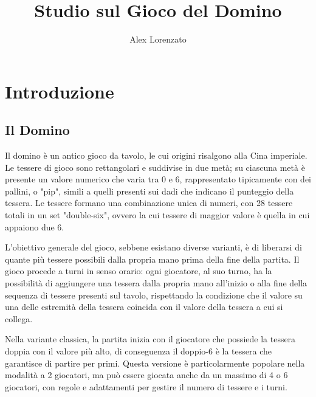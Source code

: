 \documentclass[a4paper.12pt]{report} %
\begin{document}
\title{Studio sul Gioco del Domino}
\author{Alex Lorenzato}
\maketitle

\tableofcontents %



\chapter{Introduzione}

\section{Il Domino}

Il domino è un antico gioco da tavolo, le cui origini risalgono alla Cina imperiale. Le tessere di gioco sono rettangolari e suddivise in due metà; su ciascuna metà è presente un valore numerico che varia tra 0 e 6, rappresentato tipicamente con dei pallini, o "pip", simili a quelli presenti sui dadi che indicano il punteggio della tessera. Le tessere formano una combinazione unica di numeri, con 28 tessere totali in un set "double-six", ovvero la cui tessere di maggior valore è quella in cui appaiono due 6.

L'obiettivo generale del gioco, sebbene esistano diverse varianti, è di liberarsi di quante più tessere possibili dalla propria mano prima della fine della partita. Il gioco procede a turni in senso orario: ogni giocatore, al suo turno, ha la possibilità di aggiungere una tessera dalla propria mano all'inizio o alla fine della sequenza di tessere presenti sul tavolo, rispettando la condizione che il valore su una delle estremità della tessera coincida con il valore della tessera a cui si collega. 

Nella variante classica, la partita inizia con il giocatore che possiede la tessera doppia con il valore più alto, di conseguenza il doppio-6 è la tessera che garantisce di partire per primi. Questa versione è particolarmente popolare nella modalità a 2 giocatori, ma può essere giocata anche da un massimo di 4 o 6 giocatori, con regole e adattamenti per gestire il numero di tessere e i turni.
\end{document}
